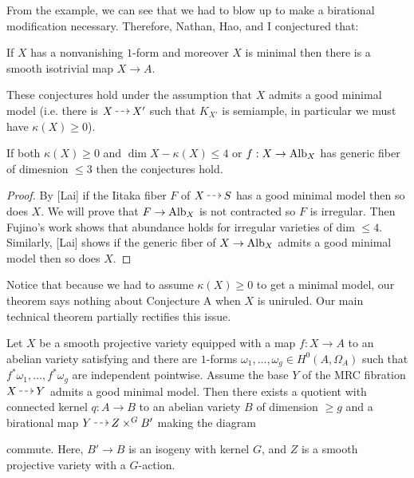 \documentclass[12pt]{article}
\begin{document}
From the example, we can see that we had to blow up to make a birational modification necessary. Therefore, Nathan, Hao, and I conjectured that:

\begin{conj}
If $X$ has a nonvanishing $1$-form and moreover $X$ is minimal then there is a smooth isotrivial map $X \to A$.
\end{conj}


\begin{theorem}[C '24]
These conjectures hold under the assumption that $X$ admits a good minimal model (i.e. there is $X \rat X'$ such that $K_{X'}$ is semiample, in particular we must have $\kappa(X) \ge 0$). 
\end{theorem}

\begin{cor}
If both $\kappa(X) \ge 0$ and $\dim{X} - \kappa(X) \le 4$ or $f : X \to \mathrm{Alb}_X$ has generic fiber of dimesnion $\le 3$ then the conjectures hold.
\end{cor}

\begin{proof}
By [Lai] if the Iitaka fiber $F$ of $X \rat S$ has a good minimal model then so does $X$. We will prove that $F \to \mathrm{Alb}_X$ is not contracted so $F$ is irregular. Then Fujino's work shows that abundance holds for irregular varieties of dim $\le 4$. Similarly, [Lai] shows if the generic fiber of $X \to \mathrm{Alb}_X$ admits a good minimal model then so does $X$.
\end{proof}

Notice that because we had to assume $\kappa(X) \ge 0$ to get a minimal model, our theorem says nothing about Conjecture A when $X$ is uniruled. Our main technical theorem partially rectifies this issue.

\begin{theorem} \label{thm:main_MRC}
Let $X$ be a smooth projective variety equipped with a map $f : X \to A$ to an abelian variety satisfying and there are $1$-forms $\omega_1, \dots, \omega_g \in H^0(A, \Omega_A)$ such that $f^* \omega_1, \dots, f^* \omega_g$ are independent pointwise. Assume the base $Y$ of the MRC fibration $X \rat Y$ admits a good minimal model. Then there exists a quotient with connected kernel $q : A \to B$ to an abelian variety $B$ of dimension $\ge g$ and a birational map $Y \rat Z \times^G B'$ making the diagram
\begin{center}
\end{center}
commute. Here, $B' \to B$ is an isogeny with kernel $G$, and $Z$ is a smooth projective variety with a $G$-action. 
\end{theorem}
\end{document}
